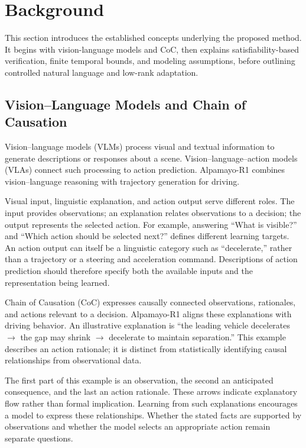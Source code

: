 \documentclass[nolineno]{ieeeaccess}
\begin{document}
\section{Background}

This section introduces the established concepts underlying the proposed method. It begins with vision-language models and CoC, then explains satisfiability-based verification, finite temporal bounds, and modeling assumptions, before outlining controlled natural language and low-rank adaptation.\par

\subsection{Vision--Language Models and Chain of Causation}

Vision--language models (VLMs) process visual and textual information to generate descriptions or responses about a scene. Vision--language--action models (VLAs) connect such processing to action prediction. Alpamayo-R1 combines vision--language reasoning with trajectory generation for driving. \cite{r1}\par

Visual input, linguistic explanation, and action output serve different roles. The input provides observations; an explanation relates observations to a decision; the output represents the selected action. For example, answering “What is visible?” and “Which action should be selected next?” defines different learning targets. An action output can itself be a linguistic category such as “decelerate,” rather than a trajectory or a steering and acceleration command. Descriptions of action prediction should therefore specify both the available inputs and the representation being learned.\par

Chain of Causation (CoC) expresses causally connected observations, rationales, and actions relevant to a decision. Alpamayo-R1 aligns these explanations with driving behavior. \cite{r1} An illustrative explanation is “the leading vehicle decelerates \ensuremath{\rightarrow} the gap may shrink \ensuremath{\rightarrow} decelerate to maintain separation.” This example describes an action rationale; it is distinct from statistically identifying causal relationships from observational data.\par

The first part of this example is an observation, the second an anticipated consequence, and the last an action rationale. These arrows indicate explanatory flow rather than formal implication. Learning from such explanations encourages a model to express these relationships. Whether the stated facts are supported by observations and whether the model selects an appropriate action remain separate questions.\par
\end{document}
